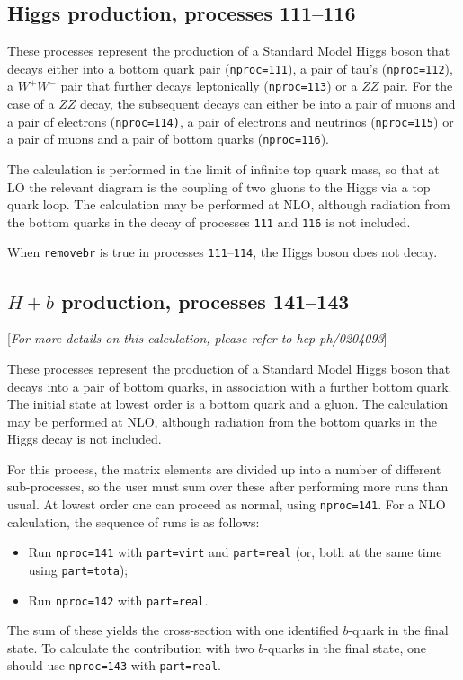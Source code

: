 \documentclass[12pt]{article}
\begin{document}
\subsection{Higgs production, processes 111--116}
\label{subsec:h}

These processes represent the production of a Standard Model Higgs
boson that decays either into a bottom quark
pair ({\tt nproc=111}), a pair of tau's ({\tt nproc=112}), a $W^+W^-$ pair
that further decays leptonically ({\tt nproc=113}) or a $ZZ$ pair.
For the case of a $ZZ$ decay,
the subsequent decays can either be into a pair of muons and a pair of electrons
({\tt nproc=114)}, a pair of electrons and neutrinos ({\tt nproc=115}) or
a pair of muons and a pair of bottom quarks ({\tt nproc=116}).

The calculation is performed in the
limit of infinite top quark mass, so that at LO the relevant diagram
is the coupling of two gluons to the Higgs via a top quark loop.
The calculation may be performed at NLO, although radiation from the
bottom quarks in the decay of processes {\tt 111} and {\tt 116} is not included.

When {\tt removebr} is true in processes {\tt 111}--{\tt 114},
the Higgs boson does not decay.

\subsection{$H+b$ production, processes 141--143}
\label{subsec:Hb}

\begin{center}
[{\it For more details on this calculation, please refer to hep-ph/0204093}]
\end{center}

These processes represent the production of a Standard Model Higgs
boson that decays into a pair of bottom quarks,
in association with a further bottom quark. The initial state at lowest order
is a bottom quark and a gluon.
The calculation may be performed at NLO, although radiation from the
bottom quarks in the Higgs decay is not included.

For this process, the matrix elements are divided up into a number of
different sub-processes, so the user must sum over these after performing
more runs than usual. At lowest order one can proceed as normal, using
{\tt nproc=141}. For a NLO calculation, the sequence of runs is as follows:
\begin{itemize}
\item Run {\tt nproc=141} with {\tt part=virt} and {\tt part=real} (or, both
at the same time using {\tt part=tota});
\item Run {\tt nproc=142} with {\tt part=real}.
\end{itemize}
The sum of these yields the cross-section with one identified $b$-quark in
the final state. To calculate the contribution with two $b$-quarks in the
final state, one should use {\tt nproc=143} with {\tt part=real}.
\end{document}
